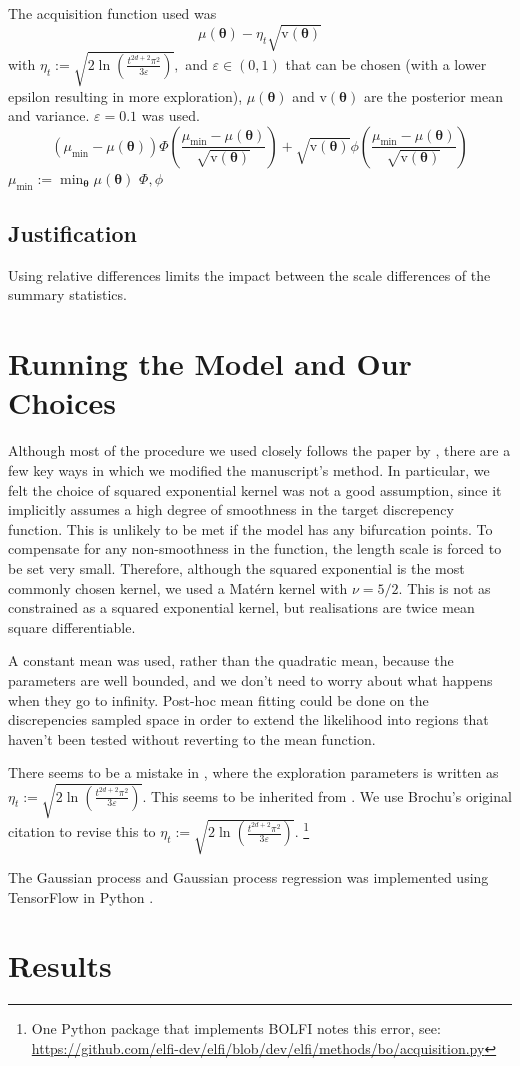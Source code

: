 The acquisition function used was
$$\mu(\bm\theta) - \eta_t\sqrt{\mathrm{v}(\bm\theta)}$$
with $\eta_t:= \sqrt{2\ln(\frac{t^{2d + 2}\pi^2}{3\varepsilon})},$ and
$\varepsilon \in (0, 1)$ that can be chosen
(with a lower epsilon resulting in more exploration), $\mu(\bm\theta)$ and
$\mathrm{v}(\bm\theta)$ are the posterior mean and variance.
$\varepsilon = 0.1$ was used.
$$(\mu_\text{min} - \mu(\bm\theta))
    \varPhi\left(
    \frac{\mu_\text{min} - \mu(\bm\theta)}{\sqrt{\mathrm{v}(\bm\theta)}}
    \right) + \sqrt{\mathrm{v}(\bm\theta)}
    \phi\left(
    \frac{\mu_\text{min} - \mu(\bm\theta)}{\sqrt{\mathrm{v}(\bm\theta)}}
    \right)$$
$\mu_\text{min} := \min_{\bm{\theta}} \mu(\bm\theta)$
$\varPhi, \phi$

\subsection*{Justification}

Using relative differences limits the impact between the scale differences of
the summary statistics.

\section{Running the Model and Our Choices}

Although most of the procedure we used closely follows the paper by
\cite{gutmann_bayesian_2016}, there are a few key ways in which we modified the
manuscript's method. In particular, we felt the choice of squared exponential
kernel was not a good assumption, since it implicitly assumes a high degree of
smoothness in the target discrepency function. This is unlikely to be met if
the model has any bifurcation points. To compensate for any non-smoothness in
the function, the length scale is forced to be set very small. Therefore,
although the squared exponential is the most commonly chosen kernel,
we used a Mat\'ern kernel with $\nu = 5/2$. This is not as constrained as a
squared exponential kernel, but realisations are twice mean square
differentiable.

A constant mean was used, rather than the quadratic mean, because the
parameters are well bounded, and we don't need to worry about what happens when
they go to infinity. Post-hoc mean fitting could be done on the discrepencies
sampled space in order to extend the likelihood into regions that haven't been
tested without reverting to the mean function.

There seems to be a mistake in \cite{gutmann_bayesian_2016}, where the
exploration parameters is written as
$\eta_t:= \sqrt{2\ln(\frac{t^{2d + 2}\pi^2}{3\varepsilon})}.$ This seems to be
inherited from \cite{brochu_tutorial_2010}. We use Brochu's original citation
\cite{srinivas_gaussian_2010} to revise this to
$\eta_t:= \sqrt{2\ln(\frac{t^{2d + 2}\pi^2}{3\varepsilon})}.$
\footnote{One Python package that implements BOLFI notes this error, see:
    \url{https://github.com/elfi-dev/elfi/blob/dev/elfi/methods/bo/acquisition.py}}

The Gaussian process and Gaussian process regression was implemented using
TensorFlow in Python \cite{abadi_tensorflow_2015}.

\section{Results}

